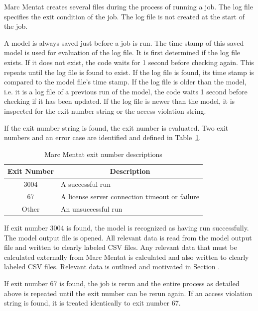 Marc Mentat creates several files during the process of running a job. The log file specifies the exit condition of the job. The log file is not created at the start of the job.

A model is always saved just before a job is run. The time stamp of this saved model is used for evaluation of the log file. It is first determined if the log file exists. If it does not exist, the code waits for 1 second before checking again. This repeats until the log file is found to exist. If the log file is found, its time stamp is compared to the model file's time stamp. If the log file is older than the model, i.e. it is a log file of a previous run of the model, the code waits 1 second before checking if it has been updated. If the log file is newer than the model, it is inspected for the exit number string or the access violation string.

If the exit number string is found, the exit number is evaluated. Two exit numbers and an error case are identified and defined in Table~\ref{tab:exno}.

\begin{table}[H]
\centering
\begin{tabular}{@{}cl@{}}
\toprule
\textbf{Exit Number} & \multicolumn{1}{c}{\textbf{Description}}       \\ \midrule
3004                 & A successful run                               \\
67                   & A license server connection timeout or failure \\
Other                & An unsuccessful run                            \\ \bottomrule
\end{tabular}
\caption{Marc Mentat exit number descriptions}
\label{tab:exno}
\end{table}

If exit number 3004 is found, the model is recognized as having run successfully. The model output file is opened. All relevant data is read from the model output file and written to clearly labeled CSV files. Any relevant data that must be calculated externally from Marc Mentat is calculated and also written to clearly labeled CSV files. Relevant data is outlined and motivated in Section .

If exit number 67 is found, the job is rerun and the entire process as detailed above is repeated until the exit number can be rerun again. If an access violation string is found, it is treated identically to exit number 67.

